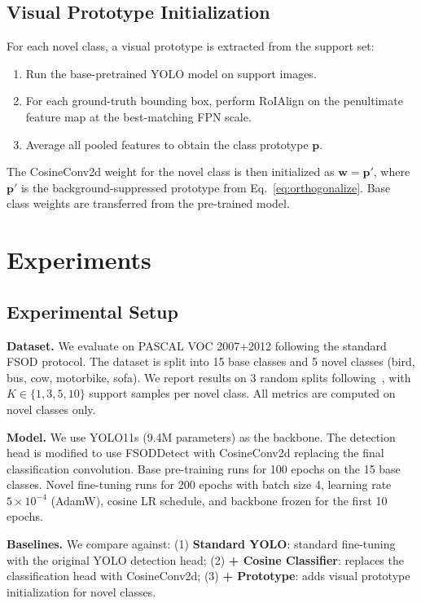 \documentclass[10pt,twocolumn,letterpaper]{article}
\begin{document}
\subsection{Visual Prototype Initialization}

For each novel class, a visual prototype is extracted from the support set:
\begin{enumerate}
    \item Run the base-pretrained YOLO model on support images.
    \item For each ground-truth bounding box, perform RoIAlign on the penultimate
          feature map at the best-matching FPN scale.
    \item Average all pooled features to obtain the class prototype $\mathbf{p}$.
\end{enumerate}

The CosineConv2d weight for the novel class is then initialized as
$\mathbf{w} = \mathbf{p}'$, where $\mathbf{p}'$ is the background-suppressed prototype
from Eq.~\ref{eq:orthogonalize}. Base class weights are transferred from the pre-trained model.

\section{Experiments}
\label{sec:experiments}

\subsection{Experimental Setup}

\textbf{Dataset.} We evaluate on PASCAL VOC 2007+2012 following the standard FSOD protocol.
The dataset is split into 15 base classes and 5 novel classes (bird, bus, cow, motorbike, sofa).
We report results on 3 random splits following~\cite{wang2020few}, with $K \in \{1, 3, 5, 10\}$
support samples per novel class. All metrics are computed on novel classes only.

\textbf{Model.} We use YOLO11s (9.4M parameters) as the backbone. The detection head is
modified to use FSODDetect with CosineConv2d replacing the final classification convolution.
Base pre-training runs for 100 epochs on the 15 base classes. Novel fine-tuning runs for
200 epochs with batch size 4, learning rate $5\times10^{-4}$ (AdamW), cosine LR schedule,
and backbone frozen for the first 10 epochs.

\textbf{Baselines.} We compare against: (1) \textbf{Standard YOLO}: standard fine-tuning
with the original YOLO detection head; (2) \textbf{+ Cosine Classifier}: replaces the
classification head with CosineConv2d; (3) \textbf{+ Prototype}: adds visual prototype
initialization for novel classes.
\end{document}
